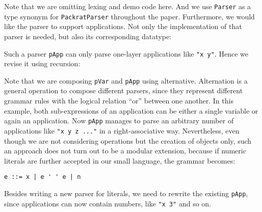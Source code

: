 
Note that we are omitting lexing and demo code here. And we use \lstinline{Parser} as a type synonym for \lstinline{PackratParser} throughout the paper. Furthermore, we would like the parser to support applications.
Not only the implementation of that parser is needed, but also its corresponding datatype:


Such a parser \lstinline{pApp} can only parse one-layer applications like \lstinline{"x y"}. Hence we revise it using recursion:


Note that we are composing \lstinline{pVar} and \lstinline{pApp} using alternative. Alternation is a general operation to compose different parsers, since they represent different grammar rules with the logical relation ``or'' between one another. In this example, both sub-expressions of an application can be either a single variable or again an application. Now \lstinline{pApp} manages to parse an arbitrary number of applications like \lstinline{"x y z ..."} in a right-associative way.
Nevertheless, even though we are not considering operations but the creation of objects only, such an approach does not turn out to be a modular extension, because if numeric literals are further accepted in our small language, the grammar becomes:
\begin{lstlisting}
e ::= x | e ' ' e | n
\end{lstlisting}
Besides writing a new parser for literals, we need to rewrite the existing \lstinline{pApp}, since applications can now contain numbers, like \lstinline{"x 3"} and so on.



